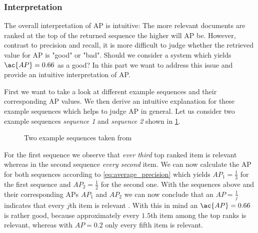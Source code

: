 \subsubsection{Interpretation}
\label{chp:fundamentals:sec:metrics:subsec:average_precision:interpretation}
The overall interpretation of \ac{AP} is intuitive: The more relevant documents are ranked at the top of the returned sequence the higher will \ac{AP} be.
However, contrast to precision and recall, it is more difficult to judge whether the retrieved value for \ac{AP} is "good" or "bad".
Should we consider a system which yields $\ac{AP}=0.66$ as a good?
In this part we want to address this issue and provide an intuitive interpretation of \ac{AP}.

First we want to take a look at different example sequences and their corresponding \ac{AP} values.
We then derive an intuitive explanation for these example sequences which helps to judge \ac{AP} in general.
Let us consider two example sequences \textit{sequence 1} and \textit{sequence 2} shown in \cref{fig:metrics:average_precision:interpreation:sample}.

\begin{figure}[htpb]
    \centering
    \def\svgwidth{\columnwidth}
    
    \caption[Two Example Sequences]{Two example sequences taken from \textcite{Tapaswi:2012}}\label{fig:metrics:average_precision:interpreation:sample}
\end{figure}

For the first sequence we observe that \textit{ever third} top ranked item is relevant whereas in the second sequence \textit{every second} item.
We can now calculate the \ac{AP} for both sequences according to \cref{eq:average_precision} which yields $AP_1= \frac{1}{3}$ for the first sequence and $AP_2= \frac{1}{2}$ for the second one.
With the sequences above and their corresponding \acp{AP} $AP_1$ and $AP_2$ we can now conclude that an $AP=\frac{1}{j}$ indicates that every $j$th item is relevant \parencite{Tapaswi:2012}.
With this in mind an $\ac{AP}=0.66$ is rather good, because approximately every $1.5$th item among the top ranks is relevant, whereas with $AP=0.2$ only every fifth item is relevant.
